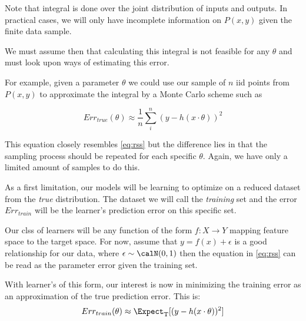Note that integral is done over the joint distribution of inputs and outputs. In practical cases, we will only have incomplete information on $P(x,y)$ given the finite data sample.

We must assume then that calculating this integral is not feasible for any $\theta$ and must look upon ways of estimating this error.

For example, given a parameter $\theta$ we could use our sample of $n$ iid points from $P(x,y)$ to approximate the integral by a Monte Carlo scheme such as 

\begin{equation} \label{eq:mcarlo-approx}
Err_{true}(\theta)  \approx \frac{1}{n} \sum_i^n ( y - h(x \cdot \theta) )^2
\end{equation}

This equation closely resembles \ref{eq:rss} but the difference lies in that the sampling process should be repeated for each specific $\theta$. Again, we have only a limited amount of samples to do this.

As a first limitation, our models will be learning to optimize on a reduced dataset from the \textit{true} distribution. The dataset we will call the \textit{training} set and the error $Err_{train}$ will be the learner's prediction error on this specific set.



Our clss of learners will be any function of the form $f: X \rightarrow Y$ mapping feature space to the target space. For now, assume that $y  =  f(x)  +  \epsilon $ is a good relationship for our data, where $\epsilon \sim \calN(0,1) $ then the equation in \ref{eq:rss} can be read as the parameter error given the training set.

With learner's of this form, our interest is now in minimizing the training error as an approximation of the true prediction error. This is:
\[
Err_{train}(\theta) \approx \Expect_{ \mathrm{T}}[(y - h(x \cdot \theta) )^2]
\]

